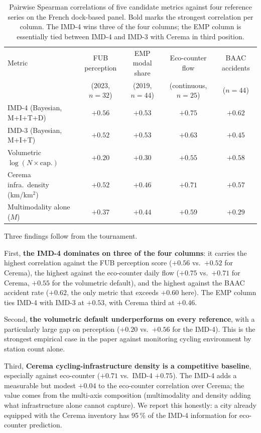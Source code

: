 \documentclass[11pt,a4paper]{article}
\begin{document}
\begin{table}[H]
\centering
\caption{Pairwise Spearman correlations of five candidate
metrics against four reference series on the French
dock-based panel. Bold marks the strongest correlation per
column. The IMD-4 wins three of the four columns; the EMP
column is essentially tied between IMD-4 and IMD-3 with Cerema
in third position.}
\label{tab:tournament}
\small
\begin{tabular}{@{}lcccc@{}}
\toprule
Metric &
FUB perception &
EMP modal share &
Eco-counter flow &
BAAC accidents \\
& (2023, $n = 32$) &
  (2019, $n = 44$) &
  (continuous, $n = 25$) &
  ($n = 44$) \\
\midrule
IMD-4 (Bayesian, M+I+T+D)  & $\mathbf{+0.56}$ & $\mathbf{+0.53}$ & $\mathbf{+0.75}$ & $\mathbf{+0.62}$ \\
IMD-3 (Bayesian, M+I+T)    & $+0.52$ & $+0.53$ & $+0.63$ & $+0.45$ \\
Volumetric $\log(N\times\text{cap.})$
                           & $+0.20$ & $+0.30$ & $+0.55$ & $+0.58$ \\
Cerema infra.\ density (km/km$^{2}$)
                           & $+0.52$ & $+0.46$ & $+0.71$ & $+0.57$ \\
Multimodality alone ($M$)  & $+0.37$ & $+0.44$ & $+0.59$ & $+0.29$ \\
\bottomrule
\end{tabular}
\end{table}

Three findings follow from the tournament.

First, \textbf{the IMD-4 dominates on three of the four
columns}: it carries the highest correlation against the FUB
perception score ($+0.56$ vs.\ $+0.52$ for Cerema), the highest
against the eco-counter daily flow ($+0.75$ vs.\ $+0.71$ for
Cerema, $+0.55$ for the volumetric default), and the highest
against the BAAC accident rate ($+0.62$, the only metric that
exceeds $+0.60$ here). The EMP column ties IMD-4 with IMD-3 at
$+0.53$, with Cerema third at $+0.46$.

Second, \textbf{the volumetric default underperforms on every
reference}, with a particularly large gap on perception
($+0.20$ vs.\ $+0.56$ for the IMD-4). This is the strongest
empirical case in the paper against monitoring cycling
environment by station count alone.

Third, \textbf{Cerema cycling-infrastructure density is a
competitive baseline}, especially against eco-counter ($+0.71$
vs.\ IMD-4 $+0.75$). The IMD-4 adds a measurable but modest
$+0.04$ to the eco-counter correlation over Cerema; the value
comes from the multi-axis composition (multimodality and
density adding what infrastructure alone cannot capture). We
report this honestly: a city already equipped with the Cerema
inventory has 95\,\% of the IMD-4 information for eco-counter
prediction.
\end{document}

